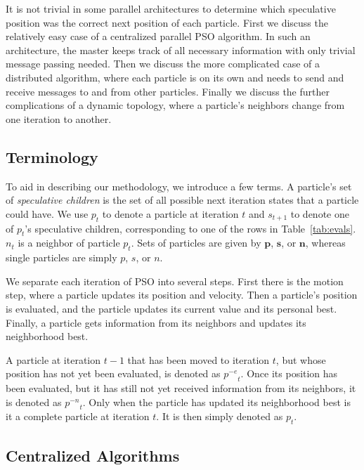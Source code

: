 \documentclass[letterpaper]{sig-alt-release2}
\providecommand{\noeval}[1]{\ensuremath{#1^{-e}}}
\providecommand{\nonbest}[1]{\ensuremath{#1^{-n}}}
\providecommand{\p}{\ensuremath{p}}
\providecommand{\pset}{\ensuremath{\mathbf{p}}}
\providecommand{\s}{\ensuremath{s}}
\providecommand{\sset}{\ensuremath{\mathbf{s}}}
\providecommand{\n}{\ensuremath{n}}
\providecommand{\nset}{\ensuremath{\mathbf{n}}}
\begin{document}
It is not trivial in some parallel architectures to determine which speculative
position was the correct next position of each particle.  First we discuss the
relatively easy case of a centralized parallel PSO algorithm.  In such an
architecture, the master keeps track of all necessary information with only
trivial message passing needed.  Then we discuss the more complicated case of a
distributed algorithm, where each particle is on its own and needs to send and
receive messages to and from other particles.  Finally we discuss the further
complications of a dynamic topology, where a particle's neighbors change from
one iteration to another.

\subsection{Terminology}

To aid in describing our methodology, we introduce a few terms.  A particle's
set of \emph{speculative children} is the set of all possible next iteration
states that a particle could have.  We use $\p_t$ to denote a particle at
iteration $t$ and $\s_{t+1}$ to denote one of $\p_t$'s speculative children,
corresponding to one of the rows in Table~\ref{tab:evals}.  $\n_t$ is a
neighbor of particle $\p_t$.  Sets of particles are given by $\pset$, $\sset$,
or $\nset$, whereas single particles are simply $\p$, $\s$, or $\n$.

We separate each iteration of PSO into several steps.  First there is the
motion step, where a particle updates its position and velocity.  Then a
particle's position is evaluated, and the particle updates its current value
and its personal best.  Finally, a particle gets information from its neighbors
and updates its neighborhood best.

A particle at iteration $t-1$ that has been moved to iteration $t$, but whose
position has not yet been evaluated, is denoted as $\noeval{\p}_t$.  Once its
position has been evaluated, but it has still not yet received information from
its neighbors, it is denoted as $\nonbest{\p}_t$.  Only when the particle has
updated its neighborhood best is it a complete particle at iteration $t$.  It is
then simply denoted as $\p_t$.

\subsection{Centralized Algorithms}
\end{document}

